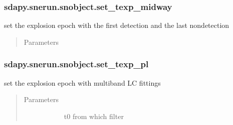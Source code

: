 \documentclass[letterpaper,10pt,english]{sphinxmanual}
\begin{document}
\begin{fulllineitems}
\subsubsection{sdapy.snerun.snobject.set\_texp\_midway}
\label{\detokenize{generated/sdapy.snerun.snobject.set_texp_midway:sdapy-snerun-snobject-set-texp-midway}}\label{\detokenize{generated/sdapy.snerun.snobject.set_texp_midway::doc}}

\begin{fulllineitems}
\label{\detokenize{generated/sdapy.snerun.snobject.set_texp_midway:sdapy.snerun.snobject.set_texp_midway}}
set the explosion epoch with the first detection and the last non\sphinxhyphen{}detection
\begin{quote}\begin{description}
\item[{Parameters}] \leavevmode\begin{description}
\item[{}] \leavevmode
\end{description}

\end{description}\end{quote}

\end{fulllineitems}



\subsubsection{sdapy.snerun.snobject.set\_texp\_pl}
\label{\detokenize{generated/sdapy.snerun.snobject.set_texp_pl:sdapy-snerun-snobject-set-texp-pl}}\label{\detokenize{generated/sdapy.snerun.snobject.set_texp_pl::doc}}

\begin{fulllineitems}
\label{\detokenize{generated/sdapy.snerun.snobject.set_texp_pl:sdapy.snerun.snobject.set_texp_pl}}
set the explosion epoch with multiband LC fittings
\begin{quote}\begin{description}
\item[{Parameters}] \leavevmode\begin{description}
\item[{}] \leavevmode{[}\sphinxtitleref{str}{]}
t0 from which filter


\end{description}
\end{description}
\end{quote}
\end{fulllineitems}
\end{fulllineitems}
\end{document}

